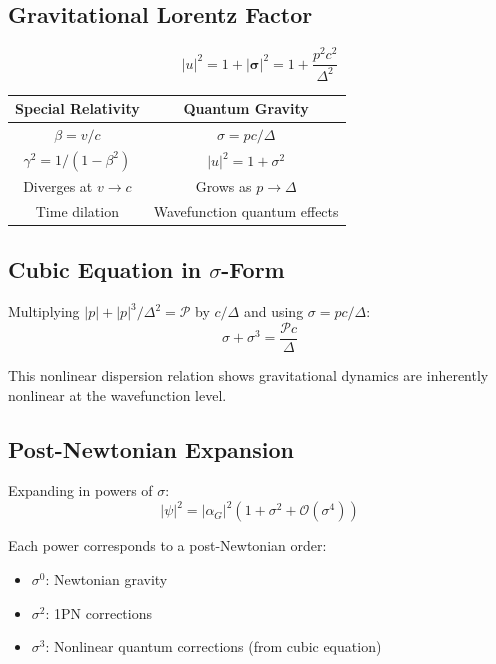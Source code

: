 \documentclass[11pt,a4paper]{article}
\theoremstyle{definition}
\theoremstyle{remark}
\begin{document}
	\subsection{Gravitational Lorentz Factor}
	
	\begin{equation}
		\boxed{|u|^2 = 1+|\boldsymbol{\sigma}|^2 = 1+\frac{p^2c^2}{\Delta^2}}
		\label{eq:gravitational_lorentz_factor}
	\end{equation}
	
	\begin{center}
		\begin{tabular}{c|c}
			\textbf{Special Relativity} & \textbf{Quantum Gravity} \\
			\hline
			$\beta = v/c$ & $\sigma = pc/\Delta$ \\
			$\gamma^2 = 1/(1-\beta^2)$ & $|u|^2 = 1+\sigma^2$ \\
			Diverges at $v\to c$ & Grows as $p\to\Delta$ \\
			Time dilation & Wavefunction quantum effects \\
		\end{tabular}
	\end{center}
	
	\subsection{Cubic Equation in $\sigma$-Form}
	
	Multiplying $|p|+|p|^3/\Delta^2=\mathcal{P}$ by $c/\Delta$ and using $\sigma=pc/\Delta$:
	\begin{equation}
		\boxed{\sigma + \sigma^3 = \frac{\mathcal{P}c}{\Delta}}
		\label{eq:cubic_sigma}
	\end{equation}
	
	This nonlinear dispersion relation shows gravitational dynamics are inherently nonlinear at the wavefunction level.
	
	\subsection{Post-Newtonian Expansion}
	
	Expanding in powers of $\sigma$:
	\begin{equation}
		|\psi|^2 = |\alpha_G|^2(1+\sigma^2+\mathcal{O}(\sigma^4))
	\end{equation}
	
	Each power corresponds to a post-Newtonian order:
	\begin{itemize}
		\item $\sigma^0$: Newtonian gravity
		\item $\sigma^2$: 1PN corrections
		\item $\sigma^3$: Nonlinear quantum corrections (from cubic equation)
	\end{itemize}
	
\end{document}
